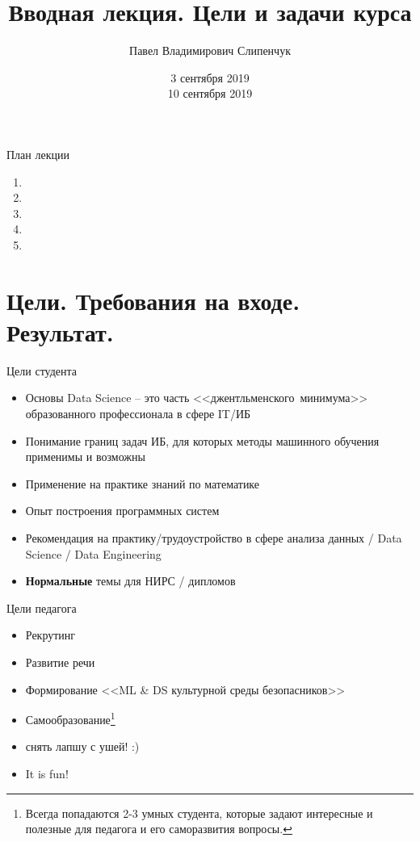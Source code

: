 \documentclass{beamer}
\title{Вводная лекция. Цели и задачи курса}
\date{3 сентября 2019 \\ 10 сентября 2019}
\author{Павел Владимирович Слипенчук}
\institute{Москва, МГТУ им.Бауманка,\\ каф.ИУ-8, КИБ}
\newcommand{\рис}[1]{рис.\ref{#1}}
\newcommand{\Рис}[1]{Рис.\ref{#1}}
\newcommand{\таблицa}[1]{таблица~№\ref{#1}} %
\newcommand{\таблицы}[1]{таблицы~№\ref{#1}} %
\newcommand{\таблице}[1]{таблице~№\ref{#1}} %
\newcommand{\таблицу}[1]{таблицу~№\ref{#1}} %
\newcommand{\таблицей}[1]{таблицей~№\ref{#1}} %
\newcommand{\Таблицa}[1]{Таблица~№\ref{#1}} %
\newcommand{\Таблицы}[1]{Таблицы~№\ref{#1}} %
\newcommand{\Таблице}[1]{Таблице~№\ref{#1}} %
\newcommand{\Таблицу}[1]{Таблицу~№\ref{#1}} %
\newcommand{\Таблицей}[1]{Таблицей~№\ref{#1}} %
\begin{document}
  \maketitle
    
   \begin{frame}{План лекции}
   \begin{enumerate}
   	\item {}
   	\item {}
   		\item {}
   		\item {}
   		\item {}
   	\end{enumerate}
   \end{frame}
  
  
  \section{Цели. Требования на входе. Результат.}\label{section:goals}
    
  \begin{frame}{Цели студента}
  	\begin{itemize}
  		\item Основы Data Science -- это часть
  <<джентльменского~минимума>>
  образованного профессионала 
  в сфере IT/ИБ 
  		\item Понимание границ задач ИБ,
  для которых методы машинного обучения
  применимы и возможны
  		\item Применение на практике знаний
  по математике
  		\item Опыт построения программных систем
  		\item Рекомендация на практику/трудоустройство 
  в сфере анализа данных / Data Science / Data Engineering
  		\item \textbf{Нормальные} темы для НИРС / дипломов
  	\end{itemize}
  \end{frame}
  
     
  \begin{frame}{Цели педагога}
  	\begin{itemize}
  		\item Рекрутинг
  		\item Развитие речи
  		\item Формирование <<ML \& DS культурной среды безопасников>>
  		\item Самообразование\footnote{
  		Всегда попадаются 2-3 умных студента, которые задают интересные и полезные для педагога и его саморазвития вопросы.}
  	    \item снять лапшу с ушей! :)
  		\item It is fun!
	\end{itemize}
  \end{frame}
  
\end{document}
